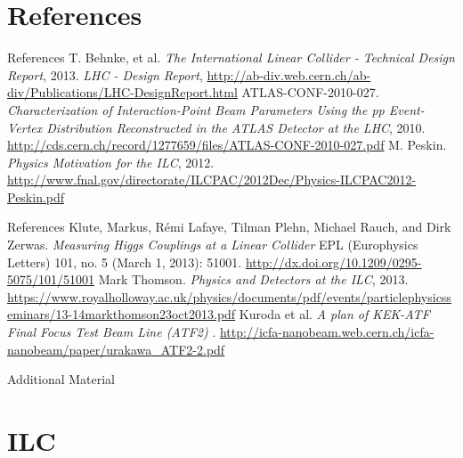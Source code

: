 \documentclass[xcolor={dvipsnames}]{beamer}
\begin{document}
\section*{References}
\begin{thebibliography}{9}
\begin{frame}{References}
 T. Behnke, et al.
\emph{The International Linear Collider - Technical Design Report}, 2013.
 \emph{LHC - Design Report}, \url{http://ab-div.web.cern.ch/ab-div/Publications/LHC-DesignReport.html}
 ATLAS-CONF-2010-027. \emph{Characterization of Interaction-Point Beam Parameters Using the pp Event-Vertex Distribution Reconstructed in the ATLAS Detector at the LHC}, 2010. \url{http://cds.cern.ch/record/1277659/files/ATLAS-CONF-2010-027.pdf}
 M. Peskin. \emph{Physics Motivation for the ILC}, 2012. \url{http://www.fnal.gov/directorate/ILCPAC/2012Dec/Physics-ILCPAC2012-Peskin.pdf}
\end{frame}
\begin{frame}{References}
 Klute, Markus, Rémi Lafaye, Tilman Plehn, Michael Rauch, and
Dirk Zerwas. \emph{Measuring Higgs Couplings at a Linear Collider}
EPL (Europhysics Letters) 101, no. 5 (March 1, 2013): 51001. \url{http://dx.doi.org/10.1209/0295-5075/101/51001}
 Mark Thomson. \emph{Physics and Detectors at the ILC}, 2013. \url{https://www.royalholloway.ac.uk/physics/documents/pdf/events/particlephysicsseminars/13-14markthomson23oct2013.pdf}
 Kuroda et al. \emph{A plan of KEK-ATF Final Focus Test Beam Line (ATF2)
}. \url{http://icfa-nanobeam.web.cern.ch/icfa-nanobeam/paper/urakawa_ATF2-2.pdf}

\end{frame}
\end{thebibliography}

\appendix

\begin{frame}
\begin{center}
\LARGE Additional Material
\end{center}
  \tableofcontents
\end{frame}

\section{ILC}


\end{document}
